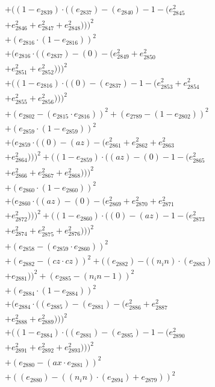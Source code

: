 \documentclass[10pt, a4paper]{article}
\begin{document}
\begin{small}
\begin{align*}
& + ((1 - e_{2839})  \cdot  ((e_{2837}) - (e_{2840}) - 1 - (e_{2845}^{2} \\
& + e_{2846}^{2} + e_{2847}^{2} + e_{2848}^{2})))^{2} \\
& + (e_{2816}  \cdot  (1 - e_{2816}))^{2} \\
& + (e_{2816}  \cdot  ((e_{2837}) - (0) - (e_{2849}^{2} + e_{2850}^{2} \\
& + e_{2851}^{2} + e_{2852}^{2})))^{2} \\
& + ((1 - e_{2816})  \cdot  ((0) - (e_{2837}) - 1 - (e_{2853}^{2} + e_{2854}^{2} \\
& + e_{2855}^{2} + e_{2856}^{2})))^{2} \\
& + (e_{2802} - (e_{2815}  \cdot  e_{2816}))^{2} + (e_{2789} - (1 - e_{2802}))^{2} \\
& + (e_{2859}  \cdot  (1 - e_{2859}))^{2} \\
& + (e_{2859}  \cdot  ((0) - (az) - (e_{2861}^{2} + e_{2862}^{2} + e_{2863}^{2} \\
& + e_{2864}^{2})))^{2} + ((1 - e_{2859})  \cdot  ((az) - (0) - 1 - (e_{2865}^{2} \\
& + e_{2866}^{2} + e_{2867}^{2} + e_{2868}^{2})))^{2} \\
& + (e_{2860}  \cdot  (1 - e_{2860}))^{2} \\
& + (e_{2860}  \cdot  ((az) - (0) - (e_{2869}^{2} + e_{2870}^{2} + e_{2871}^{2} \\
& + e_{2872}^{2})))^{2} + ((1 - e_{2860})  \cdot  ((0) - (az) - 1 - (e_{2873}^{2} \\
& + e_{2874}^{2} + e_{2875}^{2} + e_{2876}^{2})))^{2} \\
& + (e_{2858} - (e_{2859}  \cdot  e_{2860}))^{2} \\
& + (e_{2882} - (cz  \cdot  cz))^{2} + ((e_{2882}) - ((n_in)  \cdot  (e_{2883}) \\
& + e_{2881}))^{2} + (e_{2885} - (n_in - 1))^{2} \\
& + (e_{2884}  \cdot  (1 - e_{2884}))^{2} \\
& + (e_{2884}  \cdot  ((e_{2885}) - (e_{2881}) - (e_{2886}^{2} + e_{2887}^{2} \\
& + e_{2888}^{2} + e_{2889}^{2})))^{2} \\
& + ((1 - e_{2884})  \cdot  ((e_{2881}) - (e_{2885}) - 1 - (e_{2890}^{2} \\
& + e_{2891}^{2} + e_{2892}^{2} + e_{2893}^{2})))^{2} \\
& + (e_{2880} - (ax  \cdot  e_{2881}))^{2} \\
& + ((e_{2880}) - ((n_in)  \cdot  (e_{2894}) + e_{2879}))^{2} \\

\end{align*}
\end{small}
\end{document}
